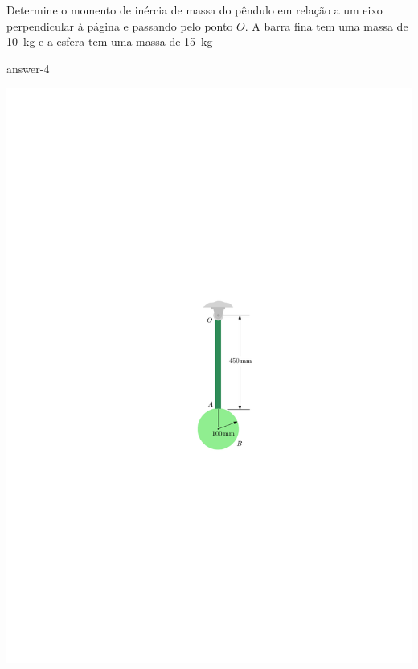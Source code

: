 \item Determine o momento de inércia de massa do pêndulo em relação a um eixo perpendicular à página e passando pelo ponto $O$. A barra fina tem uma massa de \SI{10}{\kilogram} e a esfera tem uma massa de \SI{15}{\kilogram}

{answer-4}

\vspace{-1.5cm}
\begin{flushright}
	\includegraphics[scale=1.1]{../../images/draw_4_1} 
\end{flushright}